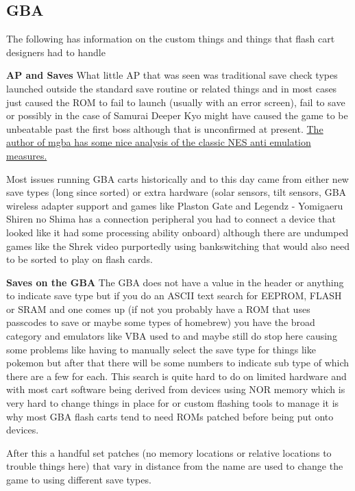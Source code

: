 \documentclass[
]{book}
\begin{document}
\hypertarget{gba-1}{%
\subsection{GBA}\label{gba-1}}

The following has information on the custom things and things that flash cart designers had to handle

\textbf{AP and Saves} What little AP that was seen was traditional save check types launched outside the standard save routine or related things and in most cases just caused the ROM to fail to launch (usually with an error screen), fail to save or possibly in the case of Samurai Deeper Kyo might have caused the game to be unbeatable past the first boss although that is unconfirmed at present. \href{https://mgba.io/2014/12/28/classic-nes/}{The author of mgba has some nice analysis of the classic NES anti emulation measures.}

Most issues running GBA carts historically and to this day came from either new save types (long since sorted) or extra hardware (solar sensors, tilt sensors, GBA wireless adapter support and games like Plaston Gate and Legendz - Yomigaeru Shiren no Shima has a connection peripheral you had to connect a device that looked like it had some processing ability onboard) although there are undumped games like the Shrek video purportedly using bankswitching that would also need to be sorted to play on flash cards.

\textbf{Saves on the GBA} The GBA does not have a value in the header or anything to indicate save type but if you do an ASCII text search for EEPROM, FLASH or SRAM and one comes up (if not you probably have a ROM that uses passcodes to save or maybe some types of homebrew) you have the broad category and emulators like VBA used to and maybe still do stop here causing some problems like having to manually select the save type for things like pokemon but after that there will be some numbers to indicate sub type of which there are a few for each. This search is quite hard to do on limited hardware and with most cart software being derived from devices using NOR memory which is very hard to change things in place for or custom flashing tools to manage it is why most GBA flash carts tend to need ROMs patched before being put onto devices.

After this a handful set patches (no memory locations or relative locations to trouble things here) that vary in distance from the name are used to change the game to using different save types.
\end{document}
